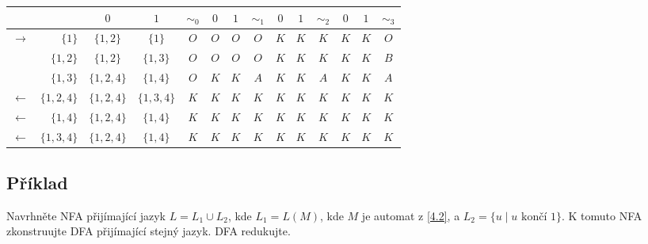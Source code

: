 \begin{center}
    \begin{tabular}{|r r|c c||c|c c||c|c c||c|c c|| c |}
        \hline
        & & $ 0 $ & $ 1 $ & $ \sim_0 $ & $ 0 $ & $ 1 $ & $ \sim_1 $ & $ 0 $ & $ 1 $ & $ \sim_2 $ & $ 0 $ & $ 1 $ & $\sim_3$ \\ \hline \hline
        $\to$ & $\{1\}$ & $\{1,2\}$ & $\{1\}$ & $O$ & $O$ & $O$ & $O$ & $K$ & $K$ & $K$ & $K$ & $K$ & $O$\\
        & $\{1,2\}$& $\{1, 2\}$ & $\{1, 3\}$ & $O$ & $O$ & $O$ & $O$ & $K$ & $K$ & $K$ & $K$ & $K$ & $B$ \\
        & $\{1,3\}$& $\{1, 2, 4\}$ & $\{1,4\}$ & $O$ & $K$ & $K$ & $A$ & $K$ & $K$ & $A$ & $K$ & $K$ & $A$ \\
        $\gets$ & $\{1,2,4\}$& $\{1, 2, 4\}$ & $\{1, 3, 4\}$ & $K$ & $K$ & $K$ & $K$ & $K$ & $K$ & $K$ & $K$ & $K$ & $K$\\
        $\gets$ & $\{1,4\}$ & $\{1,2, 4\}$ & $\{1, 4\}$ & $K$ & $K$ & $K$ & $K$ & $K$ & $K$ & $K$ & $K$ & $K$ & $K$ \\
        $\gets$ & $\{1, 3, 4\}$& $\{1, 2, 4\}$ & $\{1, 4\}$ & $K$ & $K$ & $K$ & $K$ & $K$ & $K$ & $K$ & $K$ & $K$ & $K$ \\
        \hline
    \end{tabular}

\medskip




\end{center}



\subsection{Příklad}
Navrhněte NFA přijímající jazyk $L= L_1 \cup L_2$, kde $L_1 = L(M)$, kde $M$ je automat z \ref{4.2}, a
${L_2 = \{u \mid u \text{ končí } 1\}}$. K tomuto NFA zkonstruujte DFA přijímající stejný jazyk. DFA redukujte.

